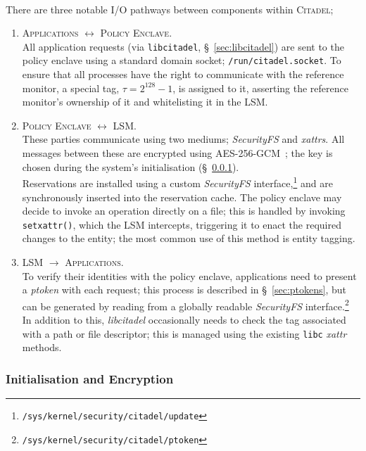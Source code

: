 \paragraph{} There are three notable I/O pathways between components within \textsc{Citadel};
\begin{enumerate}
    \item \textsc{Applications $\longleftrightarrow$ Policy Enclave}. \\
    All application requests (via \texttt{libcitadel}, §~\ref{sec:libcitadel}) are sent to the policy enclave using a standard domain socket; \texttt{/run/citadel.socket}. To ensure that all processes have the right to communicate with the reference monitor, a special tag, $\tau = 2^{128} -1$, is assigned to it, asserting the reference monitor's ownership of it and whitelisting it in the LSM.
    \item \textsc{Policy Enclave $\longleftrightarrow$ LSM}. \\
    These parties communicate using two mediums; \textit{SecurityFS} and \textit{xattrs}. All messages between these are encrypted using AES-256-GCM~\cite{Rijndael,McGrew2005TheGM}; the key is chosen during the system's initialisation (§~\ref{sec:initialisation}). \\
    Reservations are installed using a custom \textit{SecurityFS} interface,\footnote{\texttt{/sys/kernel/security/citadel/update}} and are synchronously inserted into the reservation cache. The policy enclave may decide to invoke an operation directly on a file; this is handled by invoking \texttt{setxattr()}, which the LSM intercepts, triggering it to enact the required changes to the entity; the most common use of this method is entity tagging.
    \item \textsc{LSM $\longrightarrow$ Applications}. \\
    To verify their identities with the policy enclave, applications need to present a \textit{ptoken} with each request; this process is described in §~\ref{sec:ptokens}, but can be generated by reading from a globally readable \textit{SecurityFS} interface.\footnote{\texttt{/sys/kernel/security/citadel/ptoken}} \\
    In addition to this, \textit{libcitadel} occasionally needs to check the tag associated with a path or file descriptor; this is managed using the existing \texttt{libc} \textit{xattr} methods.
\end{enumerate}

\subsubsection{Initialisation and Encryption}
\label{sec:initialisation}
